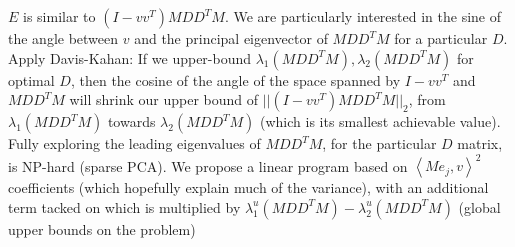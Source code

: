 \documentclass{article}
\begin{document}
$E$ is similar to $(I-vv^T)MD D^T M$. We are particularly interested in the sine of the angle between $v$ and the principal eigenvector of $MD D^T M$ for a particular $D$. Apply Davis-Kahan: If we upper-bound $\lambda_1(MD D^T M), \lambda_2(MD D^T M)$ for optimal $D$, then the cosine of the angle of the space spanned by $I-vv^T$ and $MD D^T M$ will shrink our upper bound of $||(I-vv^T) MD D^T M||_2$, from $\lambda_1(MD D^T M)$ towards $\lambda_2(MD D^T M)$ (which is its smallest achievable value). Fully exploring the leading eigenvalues of $MD D^T M$, for the particular $D$ matrix, is NP-hard (sparse PCA). We propose a linear program based on $\left< Me_j, v\right>^2$ coefficients (which hopefully explain much of the variance), with an additional term tacked on which is multiplied by $\lambda_1^u(MDD^TM)-\lambda_2^u(MDD^TM)$ (global upper bounds on the problem) 

\end{document}
